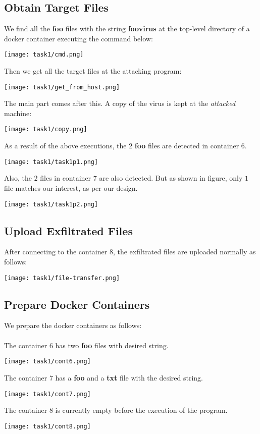 \documentclass{article}
\begin{document}
\subsection{Obtain Target Files}
We find all the \textbf{foo} files with the string \textbf{foovirus} at the top-level directory of a docker container executing the command below:
\begin{center}
    \texttt{[image: task1/cmd.png]}
\end{center}

Then we get all the target files at the attacking program:
\begin{center}
    \texttt{[image: task1/get\_from\_host.png]}
\end{center}

The main part comes after this. A copy of the virus is kept at the \textit{attacked} machine:
\begin{center}
    \texttt{[image: task1/copy.png]}
\end{center}

As a result of the above executions, the $2$ \textbf{foo} files are detected in container $6$.
\begin{center}
    \texttt{[image: task1/task1p1.png]}
\end{center}

Also, the $2$ files in container $7$ are also detected. But as shown in figure, only $1$ file matches our interest, as per our design.
\begin{center}
    \texttt{[image: task1/task1p2.png]}
\end{center}


\subsection{Upload Exfiltrated Files}
After connecting to the container $8$, the exfiltrated files are uploaded normally as follows: 
\begin{center}
    \texttt{[image: task1/file-transfer.png]}
\end{center}


\subsection{Prepare Docker Containers}
We prepare the docker containers as follows:\\\\
The container $6$ has two \textbf{foo} files with desired string.
\begin{center}
    \texttt{[image: task1/cont6.png]}
\end{center}
The container $7$ has a \textbf{foo} and a \textbf{txt} file with the desired string.
\begin{center}
    \texttt{[image: task1/cont7.png]}
\end{center}
The container $8$ is currently empty before the execution of the program.
\begin{center}
    \texttt{[image: task1/cont8.png]}
\end{center}
\end{document}
